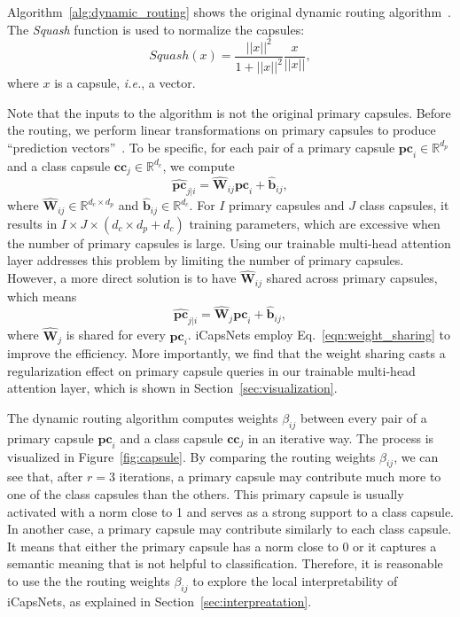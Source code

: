 \documentclass[10pt,journal,compsoc]{IEEEtran}
\begin{document}
Algorithm~\ref{alg:dynamic_routing} shows the original dynamic routing algorithm~\cite{sabour2017dynamic}. The \textit{Squash} function is used to normalize the capsules:
\begin{equation}
	Squash(x)=\frac{||x||^2}{1+||x||^2}\frac{x}{||x||},
\end{equation}
where $x$ is a capsule, \emph{i.e.}, a vector.

Note that the inputs to the algorithm is not the original primary capsules. Before the routing, we perform linear transformations on primary capsules to produce ``prediction vectors''~\cite{sabour2017dynamic}. To be specific, for each pair of a primary capsule $\mathbf{pc}_i \in \mathbb{R}^{d_p}$ and a class capsule $\mathbf{cc}_j \in \mathbb{R}^{d_c}$, we compute
\begin{equation}\label{eqn:prediction_vectors}
	\hat{\mathbf{pc}}_{j|i} = \hat{\mathbf{W}}_{ij} \mathbf{pc}_i + \hat{\mathbf{b}}_{ij},
\end{equation}
where $\hat{\mathbf{W}}_{ij} \in \mathbb{R}^{d_c \times d_p}$ and $\hat{\mathbf{b}}_{ij} \in \mathbb{R}^{d_c}$. For $I$ primary capsules and $J$ class capsules, it results in $I \times J \times (d_c \times d_p + d_c)$ training parameters, which are excessive when the number of primary capsules is large. Using our trainable multi-head attention layer addresses this problem by limiting the number of primary capsules. However, a more direct solution is to have $\hat{\mathbf{W}}_{ij}$ shared across primary capsules, which means
\begin{equation}\label{eqn:weight_sharing}
	\hat{\mathbf{pc}}_{j|i} = \hat{\mathbf{W}}_{j} \mathbf{pc}_i + \hat{\mathbf{b}}_{ij},
\end{equation}
where $\hat{\mathbf{W}}_{j}$ is shared for every $\mathbf{pc}_i$. iCapsNets employ Eq.~\eqref{eqn:weight_sharing} to improve the efficiency. More importantly, we find that the weight sharing casts a regularization effect on primary capsule queries in our trainable multi-head attention layer, which is shown in Section~\ref{sec:visualization}.

The dynamic routing algorithm computes weights $\beta_{ij}$ between every pair of a primary capsule $\mathbf{pc}_i$ and a class capsule $\mathbf{cc}_j$ in an iterative way. The process is visualized in Figure~\ref{fig:capsule}. By comparing the routing weights $\beta_{ij}$, we can see that, after $r=3$ iterations, a primary capsule may contribute much more to one of the class capsules than the others. This primary capsule is usually activated with a norm close to 1 and serves as a strong support to a class capsule. In another case, a primary capsule may contribute similarly to each class capsule. It means that either the primary capsule has a norm close to 0 or it captures a semantic meaning that is not helpful to classification. Therefore, it is reasonable to use the the routing weights $\beta_{ij}$ to explore the local interpretability of iCapsNets, as explained in Section~\ref{sec:interpreatation}.
\end{document}
